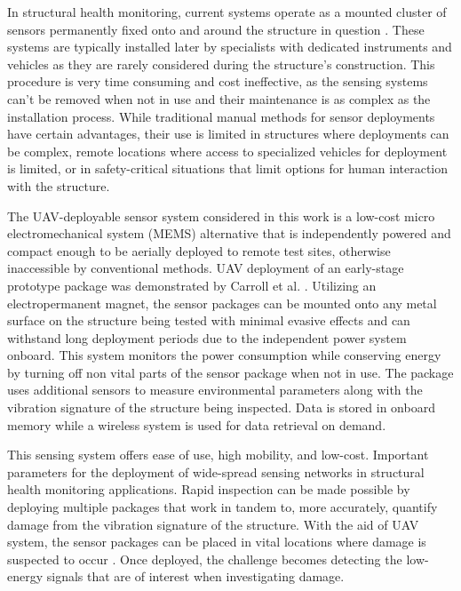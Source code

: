 \documentclass[]{spie}  %
\begin{document}
	In structural health monitoring, current systems operate as a mounted cluster of sensors permanently fixed onto and around the structure in question \cite{Pakzad2008}. These systems are typically installed later by specialists with dedicated instruments and vehicles as they are rarely considered during the structure's construction. This procedure is very time consuming and cost ineffective, as the sensing systems can’t be removed when not in use and their maintenance is as complex as the installation process. While traditional manual methods for sensor deployments have certain advantages, their use is limited in structures where deployments can be complex, remote locations where access to specialized vehicles for deployment is limited, or in safety-critical situations that limit options for human interaction with the structure. 

	The UAV-deployable sensor system considered in this work is a low-cost micro electromechanical system (MEMS) alternative \cite{Sabato2017} that is independently powered and compact enough to be aerially deployed to remote test sites, otherwise inaccessible by conventional methods. UAV deployment of an early-stage prototype package was demonstrated by Carroll et al. \cite{Carroll2021}. Utilizing an electropermanent magnet, the sensor packages can be mounted onto any metal surface on the structure being tested with minimal evasive effects \cite{Takeuchi2017} and can withstand long deployment periods due to the independent power system onboard. This system monitors the power consumption while conserving energy by turning off non vital parts of the sensor package when not in use. The package uses additional sensors to measure environmental parameters along with the vibration signature of the structure being inspected. Data is stored in onboard memory while a wireless system is used for data retrieval on demand. 

	This sensing system offers ease of use, high mobility, and low-cost. Important parameters for the deployment of wide-spread sensing networks in structural health monitoring applications. Rapid inspection can be made possible by deploying multiple packages that work in tandem to, more accurately, quantify damage from the vibration signature of the structure. With the aid of UAV system, the sensor packages can be placed in vital locations where damage is suspected to occur \cite{Chen2010}. Once deployed, the challenge becomes detecting the low-energy signals that are of interest when investigating damage. 
\end{document}
